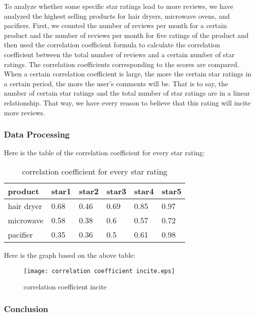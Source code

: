 \documentclass{mcmthesis}
\begin{document}
To analyze whether some specific star ratings lead to more reviews, we have analyzed the highest selling products for hair dryers, microwave ovens, and pacifiers. First, we counted the number of reviews per month for a certain product and the number of reviews per month for five ratings of the product and then used the correlation coefficient formula to calculate the correlation coefficient between the total number of reviews and a certain number of star ratings. The correlation coefficients corresponding to the scores are compared. When a certain correlation coefficient is large, the more the certain star ratings in a certain period, the more the user's comments will be. That is to say, the number of certain star ratings and the total number of star ratings are in a linear relationship. That way, we have every reason to believe that this rating will incite more reviews.

\subsubsection{Data Processing}

Here is the table of the correlation coefficient for every star rating:

\begin{table}[H]
	\centering
	\caption{correlation coefficient for every star rating}
	\resizebox{\textwidth}{!}
	{%
		\begin{tabular}{|l|l|l|l|l|l|}
			\hline
			product    & star1 & star2 & star3 & star4 & star5 \\ \hline
			hair dryer & 0.68  & 0.46  & 0.69  & 0.85  & 0.97  \\ \hline
			microwave  & 0.58  & 0.38  & 0.6   & 0.57  & 0.72  \\ \hline
			pacifier   & 0.35  & 0.36  & 0.5   & 0.61  & 0.98  \\ \hline
		\end{tabular}%
	}
\end{table}

Here is the graph based on the above table:

\begin{figure}[H]
	\small
	\centering
	\texttt{[image: correlation coefficient incite.eps]}
	\caption{correlation coefficient incite} \label{fig:correlation coefficient incite}
\end{figure}

\subsubsection{Conclusion}
\end{document}
